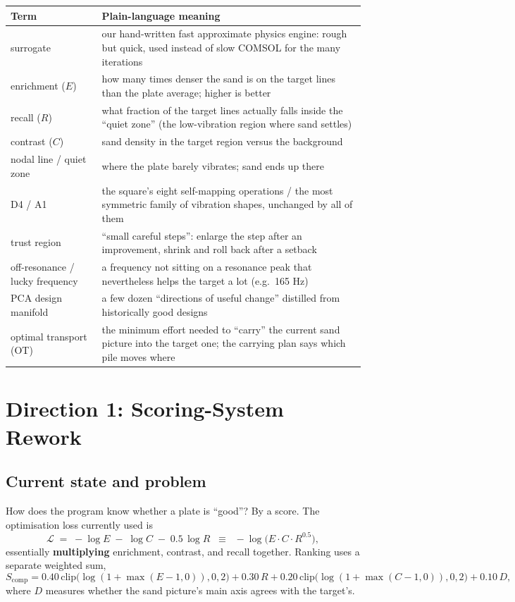 \documentclass[11pt,a4paper]{article}
\begin{document}
\begin{center}
\small
\begin{tabular}{@{}p{}p{}@{}}
\toprule
Term & Plain-language meaning \\
\midrule
surrogate & our hand-written fast approximate physics engine: rough but quick, used instead of slow COMSOL for the many iterations \\
enrichment ($E$) & how many times denser the sand is on the target lines than the plate average; higher is better \\
recall ($R$) & what fraction of the target lines actually falls inside the ``quiet zone'' (the low-vibration region where sand settles) \\
contrast ($C$) & sand density in the target region versus the background \\
nodal line / quiet zone & where the plate barely vibrates; sand ends up there \\
D4 / A1 & the square's eight self-mapping operations / the most symmetric family of vibration shapes, unchanged by all of them \\
trust region & ``small careful steps'': enlarge the step after an improvement, shrink and roll back after a setback \\
off-resonance / lucky frequency & a frequency not sitting on a resonance peak that nevertheless helps the target a lot (e.g.\ 165 Hz) \\
PCA design manifold & a few dozen ``directions of useful change'' distilled from historically good designs \\
optimal transport (OT) & the minimum effort needed to ``carry'' the current sand picture into the target one; the carrying plan says which pile moves where \\
\bottomrule
\end{tabular}
\end{center}

\section{Direction 1: Scoring-System Rework}

\subsection{Current state and problem}

How does the program know whether a plate is ``good''? By a score. The optimisation loss currently used is
\begin{equation}
\mathcal{L} \;=\; -\log E \;-\; \log C \;-\; 0.5\,\log R
\;\;\equiv\;\; -\log\!\bigl(E\cdot C\cdot R^{0.5}\bigr),
\end{equation}
essentially \textbf{multiplying} enrichment, contrast, and recall together. Ranking uses a separate weighted sum,
\begin{equation}
S_{\mathrm{comp}} = 0.40\,\mathrm{clip}\bigl(\log(1{+}\max(E{-}1,0)),0,2\bigr) + 0.30\,R + 0.20\,\mathrm{clip}\bigl(\log(1{+}\max(C{-}1,0)),0,2\bigr) + 0.10\,D,
\end{equation}
where $D$ measures whether the sand picture's main axis agrees with the target's.
\end{document}
